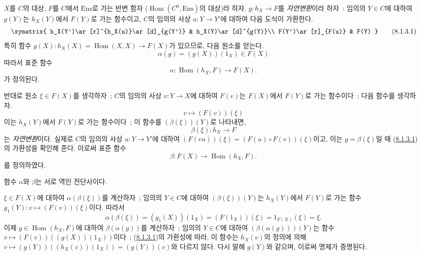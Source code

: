 \begin{env}[8.1.3]
\label{0.8.1.3-fr}
$X$를 $C$의 대상, $F$를 $C$에서 $\mathrm{Ens}$로 가는 반변 함자
($\operatorname{Hom}(C^0,\mathrm{Ens})$의 대상)라 하자.
$g:h_X\to F$를 \emph{자연변환}이라 하자~: 임의의 $Y\in C$에 대하여
$g(Y)$는 $h_X(Y)$에서 $F(Y)$로 가는 함수이고, $C$의 임의의 사상
$u:Y\to Y'$에 대하여 다음 도식이 가환한다.
\[
  \xymatrix{
    h_X(Y')\ar[r]^{h_X(u)}\ar[d]_{g(Y')} &
    h_X(Y)\ar[d]^{g(Y)}\\
    F(Y')\ar[r]_{F(u)} & F(Y)
  }
  \tag{8.1.3.1}\label{0.8.1.3.1-fr}
\]
특히 함수 $g(X):h_X(X)=\operatorname{Hom}(X,X)\to F(X)$가 있으므로,
다음 원소를 얻는다.
\[
  \alpha(g)=(g(X))(1_X)\in F(X)
  \tag{8.1.3.2}
\]
따라서 표준 함수
\[
  \alpha:\operatorname{Hom}(h_X,F)\to F(X).
  \tag{8.1.3.3}
\]
가 정의된다.

반대로 원소 $\xi\in F(X)$를 생각하자~; $C$의 임의의 사상
$v:Y\to X$에 대하여 $F(v)$는 $F(X)$에서 $F(Y)$로 가는 함수이다~;
다음 함수를 생각하자.
\[
  v\mapsto(F(v))(\xi)
  \tag{8.1.3.4}
\]
이는 $h_X(Y)$에서 $F(Y)$로 가는 함수이다~; 이 함수를
$(\beta(\xi))(Y)$로 나타내면,
\[
  \beta(\xi):h_X\to F
  \tag{8.1.3.5}
\]
는 \emph{자연변환}이다. 실제로 $C$의 임의의 사상 $u:Y\to Y'$에
대하여 $(F(vu))(\xi)=(F(u)\circ F(v))(\xi)$이고, 이는
$g=\beta(\xi)$일 때 (\hyperref[0.8.1.3.1-fr]{8.1.3.1})의 가환성을
확인해 준다. 이로써 표준 함수
\[
  \beta:F(X)\to\operatorname{Hom}(h_X,F).
  \tag{8.1.3.6}
\]
를 정의하였다.
\end{env}

\begin{proposition}[8.1.4]
\label{0.8.1.4-fr}
함수 $\alpha$와 $\beta$는 서로 역인 전단사이다.
\end{proposition}

$\xi\in F(X)$에 대하여 $\alpha(\beta(\xi))$를 계산하자~; 임의의
$Y\in C$에 대하여 $(\beta(\xi))(Y)$는 $h_X(Y)$에서 $F(Y)$로 가는
함수 $g_1(Y):v\mapsto(F(v))(\xi)$이다. 따라서
\[
  \alpha(\beta(\xi))=(g_1(X))(1_X)=(F(1_X))(\xi)
  =1_{F(X)}(\xi)=\xi.
\]
이제 $g\in\operatorname{Hom}(h_X,F)$에 대하여
$\beta(\alpha(g))$를 계산하자~; 임의의 $Y\in C$에 대하여
$(\beta(\alpha(g)))(Y)$는 함수
$v\mapsto(F(v))((g(X))(1_X))$이다~; (\hyperref[0.8.1.3.1-fr]{8.1.3.1})의
가환성에 따라, 이 함수는 $h_X(v)$의 정의에 의해
$v\mapsto(g(Y))((h_X(v))(1_X))=(g(Y))(v)$와 다르지 않다. 다시 말해
$g(Y)$와 같으며, 이로써 명제가 증명된다.

